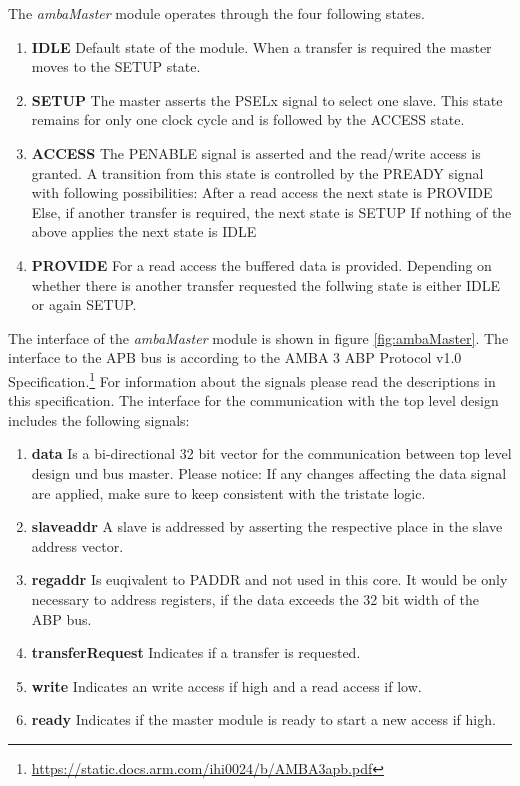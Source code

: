 \documentclass[%
	a4paper,
]
{article}
\begin{document}
The \textit{ambaMaster} module operates through the four following states.

\begin{enumerate}
	\item{\textbf{IDLE}} Default state of the module. When a transfer is required the master moves to the SETUP state.
	\item{\textbf{SETUP}} The master asserts the PSELx signal to select one slave. This state remains for only one clock cycle and is followed by the ACCESS state.
	\item{\textbf{ACCESS}} The PENABLE signal is asserted and the read/write access is granted. A transition from this state is controlled by the PREADY signal with following possibilities:
		\subitem After a read access the next state is PROVIDE
		\subitem Else, if another transfer is required, the next state is SETUP
		\subitem If nothing of the above applies the next state is IDLE
	\item{\textbf{PROVIDE}} For a read access the buffered data is provided. Depending on whether there is another transfer requested the follwing state is either IDLE or again SETUP.
\end{enumerate}

The interface of the \textit{ambaMaster} module is shown in figure \ref{fig:ambaMaster}. The interface to the APB bus is according to the AMBA 3 ABP Protocol v1.0 Specification.\footnote{\url{https://static.docs.arm.com/ihi0024/b/AMBA3apb.pdf}} For information about the signals please read the descriptions in this specification. The interface for the communication with the top level design includes the following signals:

\begin{enumerate}
	\item{\textbf{data}} Is a bi-directional 32 bit vector for the communication between top level design und bus master. Please notice: If any changes affecting the data signal are applied, make sure to keep consistent with the tristate logic.
	\item{\textbf{slaveaddr}} A slave is addressed by asserting the respective place in the slave address vector.
	\item{\textbf{regaddr}} Is euqivalent to PADDR and not used in this core. It would be only necessary to address registers, if the data exceeds the 32 bit width of the ABP bus.
	\item{\textbf{transferRequest}} Indicates if a transfer is requested.
	\item{\textbf{write}} Indicates an write access if high and a read access if low.
	\item{\textbf{ready}} Indicates if the master module is ready to start a new access if high.
\end{enumerate}
\end{document}
